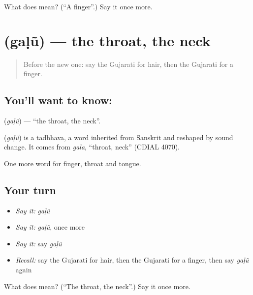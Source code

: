 \begin{tcolorbox}[breakable,colback=teal!4,colframe=teal!35!black,title={Before you move on}]
What does  mean? (\textquotedblleft{}A finger\textquotedblright{}.) Say it once more.
\end{tcolorbox}
\section[\texorpdfstring{\gu{ગળું} (gaḷũ)}{ગળું (gaḷũ)}]{ (gaḷũ) — the throat, the neck}

\label{lesson:GU-C47-throat}



\begin{quote}
Before the new one: say the Gujarati for hair, then the Gujarati for a finger.
\end{quote}

\subsection*{You'll want to know: }
\textbf{} (\emph{gaḷũ}) — \textquotedblleft{}the throat, the neck\textquotedblright{}.

\begin{cousinweb}
\textbf{} (\emph{gaḷũ}) is a tadbhava, a word inherited from Sanskrit and reshaped by sound change. It comes from \emph{gala}, \textquotedblleft{}throat, neck\textquotedblright{} (CDIAL 4070).
\end{cousinweb}

\begin{grammarlens}[title={What you've built}]
One more word for finger, throat and tongue.
\end{grammarlens}

\subsection*{Your turn}
\begin{itemize}
\raggedright
  \item \emph{Say it:} \emph{gaḷũ}
  \item \emph{Say it:} \emph{gaḷũ}, once more
  \item \emph{Say it:} say \emph{gaḷũ}
  \item \emph{Recall:} say the Gujarati for hair, then the Gujarati for a finger, then say \emph{gaḷũ} again
\end{itemize}

\begin{tcolorbox}[breakable,colback=teal!4,colframe=teal!35!black,title={Before you move on}]
What does  mean? (\textquotedblleft{}The throat, the neck\textquotedblright{}.) Say it once more.
\end{tcolorbox}
